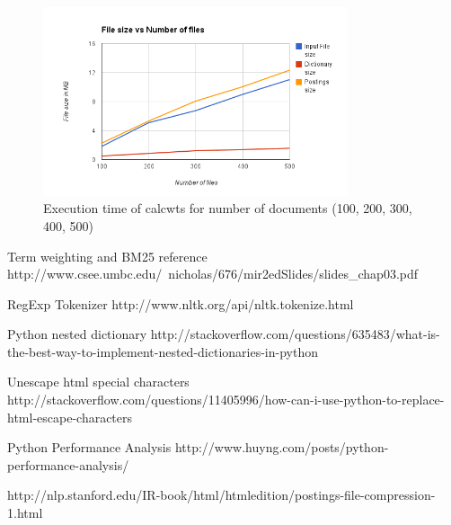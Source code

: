 \documentclass[paper=a4, fontsize=11pt]{scrartcl}
\numberwithin{equation}{section}		%
\numberwithin{figure}{section}			%
\numberwithin{table}{section}				%
\begin{document}
\begin{figure}[h] %
  \begin{center}
    \includegraphics[width=0.8\textwidth]{size_2.png}
  \end{center}
  \caption{Execution time of calcwts for number of documents (100, 200, 300, 400, 500)}
\end{figure}

\begin{thebibliography}{1}

 Term weighting and BM25 reference http://www.csee.umbc.edu/~nicholas/676/mir2edSlides/slides\_chap03.pdf

 RegExp Tokenizer http://www.nltk.org/api/nltk.tokenize.html

 Python nested dictionary http://stackoverflow.com/questions/635483/what-is-the-best-way-to-implement-nested-dictionaries-in-python
  
 Unescape html special characters http://stackoverflow.com/questions/11405996/how-can-i-use-python-to-replace-html-escape-characters

 Python Performance Analysis http://www.huyng.com/posts/python-performance-analysis/

 http://nlp.stanford.edu/IR-book/html/htmledition/postings-file-compression-1.html

  \end{thebibliography}

\end{document}
